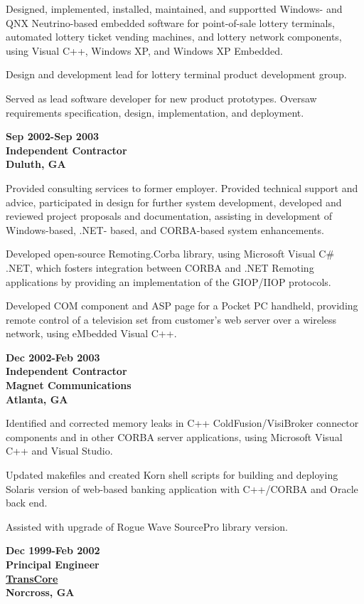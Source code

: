 Designed, implemented, installed, maintained, and supportted Windows-
and QNX Neutrino-based embedded software for point-of-sale lottery
terminals, automated lottery ticket vending machines, and lottery
network components, using Visual C++, Windows XP, and Windows XP
Embedded.

Design and development lead for lottery terminal product development
group.

Served as lead software developer for new product prototypes. Oversaw
requirements specification, design, implementation, and deployment.

\textbf{Sep 2002-Sep 2003\\
Independent Contractor\\
Duluth, GA}

Provided consulting services to former employer. Provided technical
support and advice, participated in design for further system
development, developed and reviewed project proposals and documentation,
assisting in development of Windows-based, .NET- based, and CORBA-based
system enhancements.

Developed open-source Remoting.Corba library, using Microsoft Visual C\#
.NET, which fosters integration between CORBA and .NET Remoting
applications by providing an implementation of the GIOP/IIOP protocols.

Developed COM component and ASP page for a Pocket PC handheld, providing
remote control of a television set from customer's web server over a
wireless network, using eMbedded Visual C++.

\textbf{Dec 2002-Feb 2003\\
Independent Contractor\\
Magnet Communications\\
Atlanta, GA}

Identified and corrected memory leaks in C++ ColdFusion/VisiBroker
connector components and in other CORBA server applications, using
Microsoft Visual C++ and Visual Studio.

Updated makefiles and created Korn shell scripts for building and
deploying Solaris version of web-based banking application with
C++/CORBA and Oracle back end.

Assisted with upgrade of Rogue Wave SourcePro library version.

\textbf{Dec 1999-Feb 2002\\
Principal Engineer\\
\href{https://transcore.com/its}{TransCore}\\
Norcross, GA}

